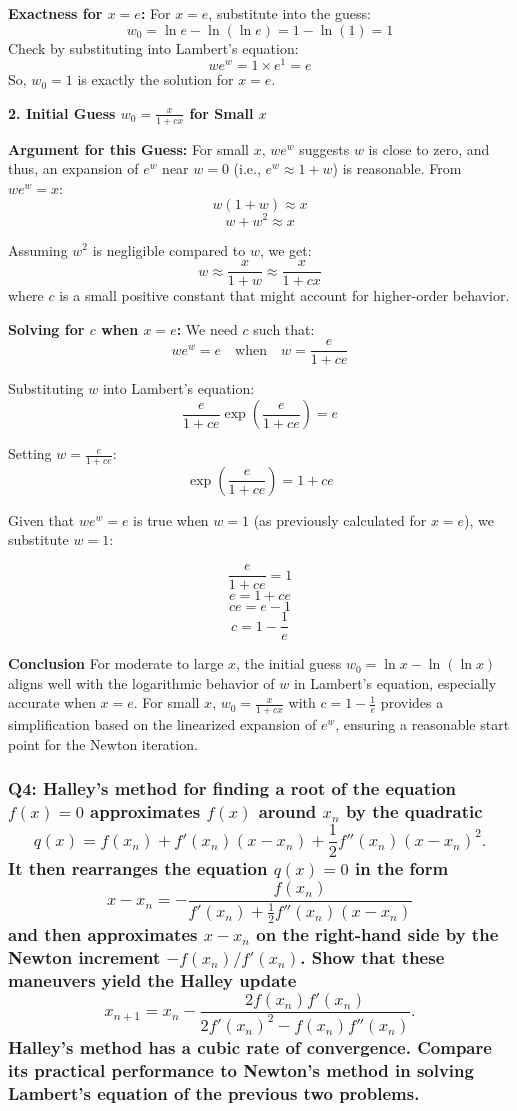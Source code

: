 \documentclass[8pt]{article}
\begin{document}
\textbf{Exactness for \(x = e\):}
For \(x = e\), substitute into the guess:
\[ w_0 = \ln e - \ln(\ln e) = 1 - \ln(1) = 1 \]
Check by substituting into Lambert's equation:
\[ we^w = 1 \times e^1 = e \]
So, \(w_0 = 1\) is exactly the solution for \(x = e\).

\textbf{2. Initial Guess \(w_0 = \frac{x}{1 + cx}\) for Small \(x\)}

\textbf{Argument for this Guess:}
For small \(x\), \(we^w\) suggests \(w\) is close to zero, and thus, an expansion of \(e^w\) near \(w = 0\) (i.e., \(e^w \approx 1 + w\)) is reasonable. From \(we^w = x\):
\[ w(1 + w) \approx x \]
\[ w + w^2 \approx x \]

Assuming \(w^2\) is negligible compared to \(w\), we get:
\[ w \approx \frac{x}{1 + w} \approx \frac{x}{1 + cx} \]
where \(c\) is a small positive constant that might account for higher-order behavior.

\textbf{Solving for \(c\) when \(x = e\):}
We need \(c\) such that:
\[ we^w = e \quad \text{when} \quad w = \frac{e}{1 + ce} \]

Substituting \(w\) into Lambert's equation:
\[ \frac{e}{1 + ce} \exp\left(\frac{e}{1 + ce}\right) = e \]

Setting \(w = \frac{e}{1 + ce}\):
\[ \exp\left(\frac{e}{1 + ce}\right) = 1 + ce \]

Given that \(we^w = e\) is true when \(w = 1\) (as previously calculated for \(x = e\)), we substitute \(w = 1\):

\[ \frac{e}{1 + ce} = 1 \]
\[ e = 1 + ce \]
\[ ce = e - 1 \]
\[ c = 1 - \frac{1}{e} \]

\textbf{Conclusion}
For moderate to large \(x\), the initial guess \(w_0 = \ln x - \ln(\ln x)\) aligns well with the logarithmic behavior of \(w\) in Lambert's equation, especially accurate when \(x = e\). For small \(x\), \(w_0 = \frac{x}{1 + cx}\) with \(c = 1 - \frac{1}{e}\) provides a simplification based on the linearized expansion of \(e^w\), ensuring a reasonable start point for the Newton iteration.

\subsubsection*{Q4: Halley’s method for finding a root of the equation \(f(x) = 0\) approximates \(f(x)\) around \(x_n\) by the quadratic
\[ q(x) = f(x_n) + f'(x_n)(x - x_n) + \frac{1}{2} f''(x_n)(x - x_n)^2. \]
It then rearranges the equation \(q(x) = 0\) in the form
\[ x - x_n = -\frac{f(x_n)}{f'(x_n) + \frac{1}{2} f''(x_n)(x - x_n)} \]
and then approximates \(x - x_n\) on the right-hand side by the Newton increment \(-f(x_n)/f'(x_n)\). Show that these maneuvers yield the Halley update
\[ x_{n+1} = x_n - \frac{2f(x_n)f'(x_n)}{2f'(x_n)^2 - f(x_n)f''(x_n)}. \]
Halley’s method has a cubic rate of convergence. Compare its practical performance to Newton’s method in solving Lambert’s equation of the previous two problems.}
\end{document}
